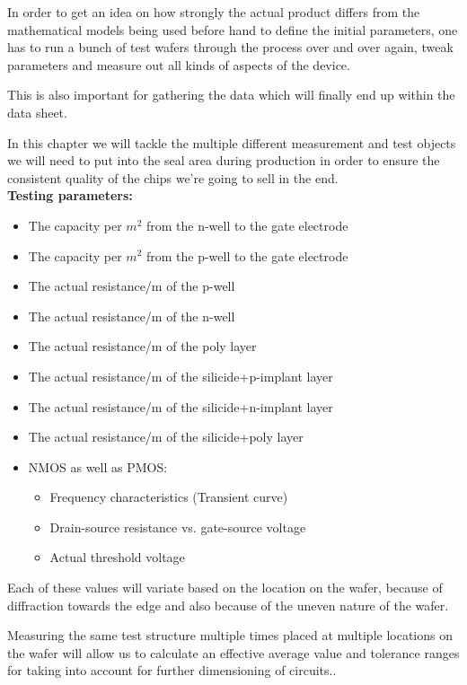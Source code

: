 In order to get an idea on how strongly the actual product differs from the mathematical models being used before hand to define the initial parameters, one has to run a bunch of test wafers through the process over and over again, tweak parameters and measure out all kinds of aspects of the device.

This is also important for gathering the data which will finally end up within the data sheet.

In this chapter we will tackle the multiple different measurement and test objects we will need to put into the seal area during production in order to ensure the consistent quality of the chips we're going to sell in the end.\\

\textbf{Testing parameters:}
\begin{itemize}
	\item The capacity per $m^2$ from the n-well to the gate electrode
	\item The capacity per $m^2$ from  the p-well to the gate electrode
	\item The actual resistance/m of the p-well
	\item The actual resistance/m of the n-well
	\item The actual resistance/m of the poly layer
	\item The actual resistance/m of the silicide+p-implant layer
	\item The actual resistance/m of the silicide+n-implant layer
	\item The actual resistance/m of the silicide+poly layer
	\item NMOS as well as PMOS:
	\begin{itemize}
		\item Frequency characteristics (Transient curve)
		\item Drain-source resistance vs. gate-source voltage
		\item Actual threshold voltage
	\end{itemize}
\end{itemize}

Each of these values will variate based on the location on the wafer, because of diffraction towards the edge and also because of the uneven nature of the wafer.

Measuring the same test structure multiple times placed at multiple locations on the wafer will allow us to calculate an effective average value and tolerance ranges for taking into account for further dimensioning of circuits..